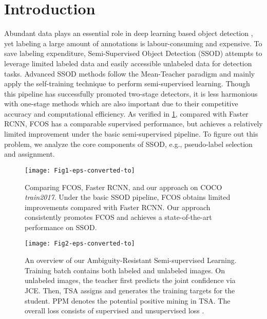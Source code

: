 \documentclass[10pt,twocolumn,letterpaper]{article}
\begin{document}
\section{Introduction}
\label{sec1}

Abundant data plays an essential role in deep learning based object detection \cite{FasterRCNN,Ssd,Yolo}, yet labeling a large amount of annotations is labour-consuming and expensive. 
To save labeling expenditure, Semi-Supervised Object Detection (SSOD) attempts to leverage limited labeled data and easily accessible unlabeled data for detection tasks.
Advanced SSOD methods \cite{UnbiasedTeacher,SoftTea} follow the Mean-Teacher \cite{MeanTea} paradigm and mainly apply the self-training \cite{PseudoLabel,NoisyStudent} technique to perform semi-supervised learning. 
Though this pipeline has successfully promoted two-stage detectors, it is less harmonious with one-stage methods which are also important due to their competitive accuracy and computational efficiency.
As verified in \cref{fig1}, compared with Faster RCNN\cite{FasterRCNN}, FCOS\cite{Fcos} has a comparable supervised performance, but achieves a relatively limited improvement under the basic semi-supervised pipeline.
To figure out this problem, we analyze the core components of SSOD, e.g., pseudo-label selection and assignment.


\begin{figure}[t]
    \centering
    \setlength{\abovecaptionskip}{5pt}
    \setlength{\belowcaptionskip}{-10pt}
    \texttt{[image: Fig1-eps-converted-to]}
    \caption{Comparing FCOS, Faster RCNN, and our approach on COCO \emph{train2017}. Under the basic SSOD pipeline, FCOS obtains limited improvements compared with Faster RCNN. Our approach consistently promotes FCOS and achieves a state-of-the-art performance on SSOD.}
    \label{fig1}
\end{figure}

\begin{figure*}[t]
    \centering
    \setlength{\abovecaptionskip}{5pt}
    \setlength{\belowcaptionskip}{-10pt}
    \texttt{[image: Fig2-eps-converted-to]}
    \caption{An overview of our Ambiguity-Resistant Semi-supervised Learning. Training batch contains both labeled and unlabeled images. On unlabeled images, the teacher first predicts the joint confidence via JCE. Then, TSA assigns and generates the training targets for the student. PPM denotes the potential positive mining in TSA. The overall loss consists of supervised  and unsupervised loss .}
    \label{fig2}
\end{figure*}
\end{document}
